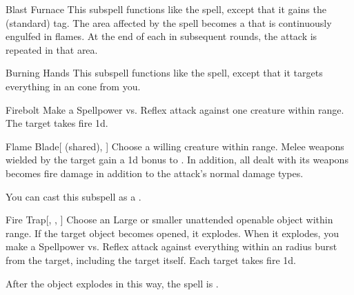 \begin{ability}[\nth{2}]{Blast Furnace}
This subspell functions like the  spell, except that it gains the  (standard) tag.
The area affected by the spell becomes a  that is continuously engulfed in flames.
At the end of each  in subsequent rounds, the attack is repeated in that area.
\end{ability}
\vspace{0.25em}


\begin{ability}[\nth{2}]{Burning Hands}
This subspell functions like the  spell, except that it targets everything in an \arealarge cone from you.
\end{ability}
\vspace{0.25em}


\begin{ability}[\nth{2}]{Firebolt}
Make a Spellpower vs. Reflex attack against one creature within \rngmed range.
\hit The target takes fire  \plus1d.
\end{ability}
\vspace{0.25em}


\begin{ability}[\nth{2}]{Flame Blade}[ (shared), ]
Choose a willing creature within \rngclose range.
Melee weapons wielded by the target gain a \plus1d bonus to .
In addition, all  dealt with its weapons becomes fire damage in addition to the attack's normal damage types.

You can cast this subspell as a .
\end{ability}
\vspace{0.25em}


\begin{ability}[\nth{3}]{Fire Trap}[, , ]
Choose an Large or smaller unattended openable object within \rngclose range.
If the target object becomes opened, it explodes.
When it explodes, you make a Spellpower vs. Reflex attack against everything within an \areamed radius burst from the target, including the target itself.
\hit Each target takes fire  \minus1d.

After the object explodes in this way, the spell is .
\end{ability}
\vspace{0.25em}


